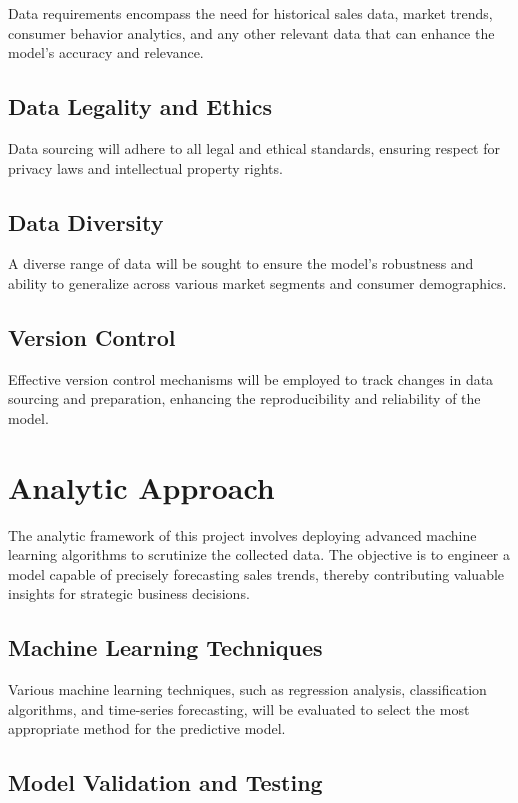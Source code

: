 \documentclass{article}
\begin{document}
Data requirements encompass the need for historical sales data, market trends, consumer behavior analytics, and any other relevant data that can enhance the model's accuracy and relevance.


\subsection{Data Legality and Ethics}

Data sourcing will adhere to all legal and ethical standards, ensuring respect for privacy laws and intellectual property rights.

\subsection{Data Diversity}

A diverse range of data will be sought to ensure the model's robustness and ability to generalize across various market segments and consumer demographics.

\subsection{Version Control}

Effective version control mechanisms will be employed to track changes in data sourcing and preparation, enhancing the reproducibility and reliability of the model.

\section{Analytic Approach}
The analytic framework of this project involves deploying advanced machine learning algorithms to scrutinize the collected data. The objective is to engineer a model capable of precisely forecasting sales trends, thereby contributing valuable insights for strategic business decisions.


\subsection{Machine Learning Techniques}

Various machine learning techniques, such as regression analysis, classification algorithms, and time-series forecasting, will be evaluated to select the most appropriate method for the predictive model.

\subsection{Model Validation and Testing}
\end{document}
